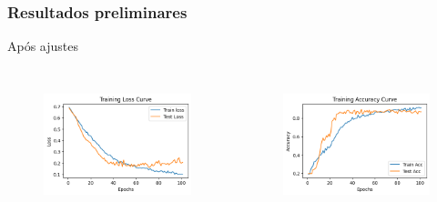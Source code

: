 \documentclass[aspectratio=169]{beamer}
\begin{document}




\begin{frame}
    \frametitle{Resultados preliminares}


    \centering
    Após ajustes

    \begin{columns}



        \begin{figure}
            \centering
            \includegraphics[scale = 0.6]{img/baixados.png}
            \label{fig:enter-label}
        \end{figure}




        \begin{figure}
            \centering
            \includegraphics[scale = 0.6]{img/baixados (1).png}
            \label{fig:enter-label}
        \end{figure}


    \end{columns}
\end{frame}
\end{document}
